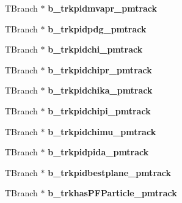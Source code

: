 \begin{DoxyCompactItemize}
\item 
\hypertarget{classanatree_a0f3cd50b87a9523f96bcf868642777e0}{T\-Branch $\ast$ {\bfseries b\-\_\-trkpidmvapr\-\_\-pmtrack}}\label{classanatree_a0f3cd50b87a9523f96bcf868642777e0}

\item 
\hypertarget{classanatree_ada61c30b08638269d869939c011ddca9}{T\-Branch $\ast$ {\bfseries b\-\_\-trkpidpdg\-\_\-pmtrack}}\label{classanatree_ada61c30b08638269d869939c011ddca9}

\item 
\hypertarget{classanatree_afd1720b1884e1de63b86b3424b3d3bdc}{T\-Branch $\ast$ {\bfseries b\-\_\-trkpidchi\-\_\-pmtrack}}\label{classanatree_afd1720b1884e1de63b86b3424b3d3bdc}

\item 
\hypertarget{classanatree_a0c87e9cc9c6e339d60baed587df0db61}{T\-Branch $\ast$ {\bfseries b\-\_\-trkpidchipr\-\_\-pmtrack}}\label{classanatree_a0c87e9cc9c6e339d60baed587df0db61}

\item 
\hypertarget{classanatree_a47a5da30cd975206c3255d43a4c77c3a}{T\-Branch $\ast$ {\bfseries b\-\_\-trkpidchika\-\_\-pmtrack}}\label{classanatree_a47a5da30cd975206c3255d43a4c77c3a}

\item 
\hypertarget{classanatree_a1b78928cede5261d5aad7f4954b25ca1}{T\-Branch $\ast$ {\bfseries b\-\_\-trkpidchipi\-\_\-pmtrack}}\label{classanatree_a1b78928cede5261d5aad7f4954b25ca1}

\item 
\hypertarget{classanatree_a093ac3df7a027f6fa3ccb1d1bf1f1a96}{T\-Branch $\ast$ {\bfseries b\-\_\-trkpidchimu\-\_\-pmtrack}}\label{classanatree_a093ac3df7a027f6fa3ccb1d1bf1f1a96}

\item 
\hypertarget{classanatree_ae5b0e3947ef8c6150ef24991f7c0328c}{T\-Branch $\ast$ {\bfseries b\-\_\-trkpidpida\-\_\-pmtrack}}\label{classanatree_ae5b0e3947ef8c6150ef24991f7c0328c}

\item 
\hypertarget{classanatree_ae4dd7a75e9b3054ad5d20421d4c82a5a}{T\-Branch $\ast$ {\bfseries b\-\_\-trkpidbestplane\-\_\-pmtrack}}\label{classanatree_ae4dd7a75e9b3054ad5d20421d4c82a5a}

\item 
\hypertarget{classanatree_a8a334c6eb01caec5a05d3e0a8b8f614c}{T\-Branch $\ast$ {\bfseries b\-\_\-trkhas\-P\-F\-Particle\-\_\-pmtrack}}\label{classanatree_a8a334c6eb01caec5a05d3e0a8b8f614c}


\end{DoxyCompactItemize}
